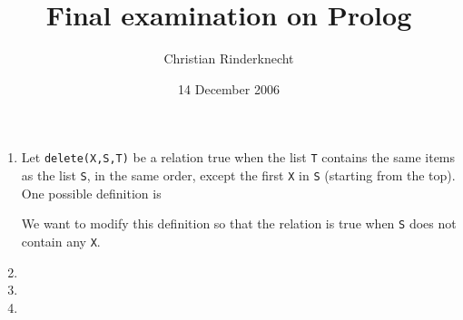 \documentclass[11pt,a4paper]{article}
\title{Final examination on Prolog}
\author{Christian Rinderknecht}
\date{14 December 2006}
\begin{document}
\maketitle
\thispagestyle{empty}

\begin{enumerate}

  \item Let \texttt{delete(X,S,T)} be a relation true when the list
    \texttt{T} contains the same items as the list \texttt{S}, in the
    same order, except the first \texttt{X} in \texttt{S} (starting
    from the top). One possible definition is
    {\small}

    \noindent We want to modify this definition so that the relation
    is true when \texttt{S} does not contain any \texttt{X}.

    
    

  \item
    
    

  \item
    
    

  \item
    
    

\end{enumerate}
\end{document}
